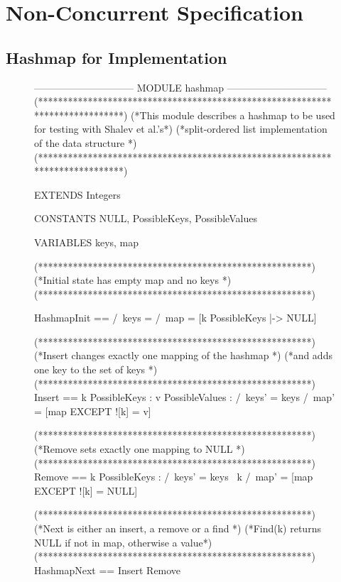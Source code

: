\documentclass{uit-thesis}
\begin{document}
\section{Non-Concurrent Specification}
\subsection{Hashmap for Implementation}
\begin{figure}
    \begin{tla}
------------------------------ MODULE hashmap ------------------------------
(*****************************************************************************)
(*This module describes a hashmap to be used for testing with Shalev et al.'s*)
(*split-ordered list implementation of the data structure                    *)
(*****************************************************************************)

EXTENDS Integers

CONSTANTS NULL, PossibleKeys, PossibleValues

VARIABLES keys, map


(*******************************************************)
(*Initial state has empty map and no keys              *)
(*******************************************************)

HashmapInit ==  /\ keys = {}
                /\ map = [k \in PossibleKeys |-> NULL]

(*******************************************************)
(*Insert changes exactly one mapping of the hashmap    *)
(*and adds one key to the set of keys                  *)
(*******************************************************)
Insert ==   \exists k \in PossibleKeys :
                \exists v \in PossibleValues :
                    /\ keys' = keys 
                    /\ map' = [map EXCEPT ![k] = v]

(*******************************************************)
(*Remove sets exactly one mapping to NULL              *)
(*******************************************************)
Remove ==   \exists k \in PossibleKeys :
                /\ keys' = keys \ {k}
                /\ map' = [map EXCEPT ![k] = NULL]

(*******************************************************)
(*Next is either an insert, a remove or a find         *)
(*Find(k) returns NULL if not in map, otherwise a value*)
(*******************************************************)          
HashmapNext ==  \/ Insert
                \/ Remove



\end{tla}
\end{figure}
\end{document}
